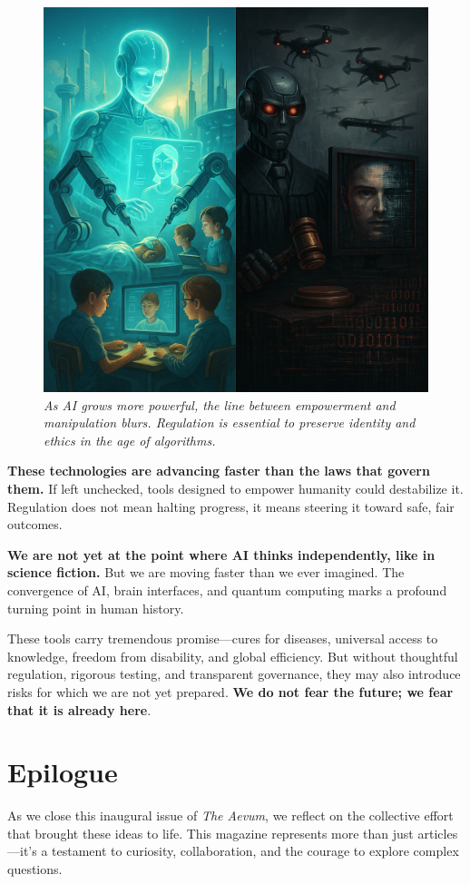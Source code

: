 \documentclass[a4paper,10pt,twocolumn]{memoir}
\begin{document}
\begin{figure}[h!]
  \centering
  \includegraphics[width=0.9\linewidth]{aivlona.png}
  \caption*{\textit{As AI grows more powerful, the line between empowerment and manipulation blurs. Regulation is essential to preserve identity and ethics in the age of algorithms.}}
\end{figure}

\textbf{These technologies are advancing faster than the laws that govern them.} If left unchecked, tools designed to empower humanity could destabilize it. Regulation does not mean halting progress, it means steering it toward safe, fair outcomes.

\textbf{We are not yet at the point where AI thinks independently, like in science fiction.} But we are moving faster than we ever imagined. The convergence of AI, brain interfaces, and quantum computing marks a profound turning point in human history.

These tools carry tremendous promise—cures for diseases, universal access to knowledge, freedom from disability, and global efficiency. But without thoughtful regulation, rigorous testing, and transparent governance, they may also introduce risks for which we are not yet prepared. \textbf{We do not fear the future; we fear that it is already here}.
\clearpage


\clearpage
\onecolumn
\section*{Epilogue}
\vspace*{0.2cm}
As we close this inaugural issue of \textit{The Aevum}, we reflect on the collective effort that brought these ideas to life. This magazine represents more than just articles—it's a testament to curiosity, collaboration, and the courage to explore complex questions.
\end{document}
